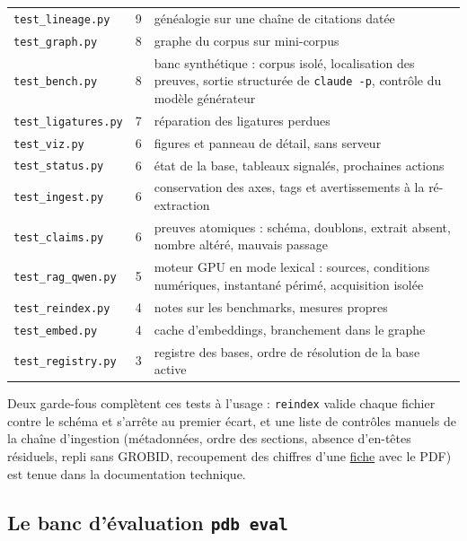 \documentclass[11pt,a4paper]{article}
\newcommand{\cmd}[1]{\texttt{#1}}
\newcommand{\gl}[2]{\hyperlink{gl:#1}{\textcolor{glcolor}{#2}}}
\begin{document}
\begin{table}[ht]
\begin{tabularx}{\linewidth}{@{}lrL@{}}
\cmd{test\_lineage.py} & 9 & généalogie sur une chaîne de citations datée \\
\cmd{test\_graph.py} & 8 & graphe du corpus sur mini-corpus \\
\cmd{test\_bench.py} & 8 & banc synthétique : corpus isolé, localisation des preuves, sortie structurée de \cmd{claude -p}, contrôle du modèle générateur \\
\cmd{test\_ligatures.py} & 7 & réparation des ligatures perdues \\
\cmd{test\_viz.py} & 6 & figures et panneau de détail, sans serveur \\
\cmd{test\_status.py} & 6 & état de la base, tableaux signalés, prochaines actions \\
\cmd{test\_ingest.py} & 6 & conservation des axes, tags et avertissements à la ré-extraction \\
\cmd{test\_claims.py} & 6 & preuves atomiques : schéma, doublons, extrait absent, nombre altéré, mauvais passage \\
\cmd{test\_rag\_qwen.py} & 5 & moteur GPU en mode lexical : sources, conditions numériques, instantané périmé, acquisition isolée \\
\cmd{test\_reindex.py} & 4 & notes sur les benchmarks, mesures propres \\
\cmd{test\_embed.py} & 4 & cache d'embeddings, branchement dans le graphe \\
\cmd{test\_registry.py} & 3 & registre des bases, ordre de résolution de la base active \\
\bottomrule
\end{tabularx}
\end{table}

Deux garde-fous complètent ces tests à l'usage : \cmd{reindex} valide chaque fichier contre
le schéma et s'arrête au premier écart, et une liste de contrôles manuels de la chaîne
d'ingestion (métadonnées, ordre des sections, absence d'en-têtes résiduels, repli sans
GROBID, recoupement des chiffres d'une \gl{fiche}{fiche} avec le PDF) est tenue dans la documentation
technique.

\subsection{Le banc d'évaluation \cmd{pdb eval}}
\label{sec:banc}
\end{document}

